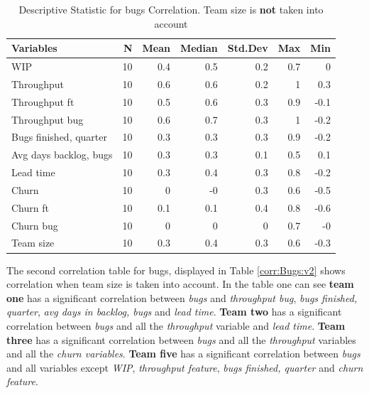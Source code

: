 \documentclass[UKenglish]{ifimaster}  %
\begin{document}
\begin{table} [h]
 \caption{Descriptive Statistic for bugs Correlation.  Team size is \textbf{not} taken into account}
 \centering
 \begin{tabular}{ | l | r | r | r | r | r | r | }
 \hline
\textbf{Variables}& \bf{N} & \bf{Mean} & \bf{Median} & \bf{Std.Dev} & \bf{Max} & \bf{Min} \\ \hline
WIP  & 10 & 0.4 & 0.5 & 0.2 & 0.7 & 0\\ \hline
Throughput  & 10 & 0.6 & 0.6 & 0.2 & 1 & 0.3\\ \hline
Throughput ft  & 10 & 0.5 & 0.6 & 0.3 & 0.9 & -0.1\\ \hline
Throughput bug  & 10 & 0.6 & 0.7 & 0.3 & 1 & -0.2\\ \hline
Bugs finished, quarter  & 10 & 0.3 & 0.3 & 0.3 & 0.9 & -0.2\\ \hline
Avg days backlog, bugs  & 10 & 0.3 & 0.3 & 0.1 & 0.5 & 0.1\\ \hline
Lead time & 10 & 0.3 & 0.4 & 0.3 & 0.8 & -0.2\\ \hline
Churn  & 10 & 0 & -0 & 0.3 & 0.6 & -0.5\\ \hline
Churn ft  & 10 & 0.1 & 0.1 & 0.4 & 0.8 & -0.6\\ \hline
Churn bug  & 10 & 0 & 0 & 0 & 0.7 & -0\\ \hline
Team size  & 10 & 0.3 & 0.4 & 0.3 & 0.6 & -0.3\\ \hline
\end{tabular}
 \label{DS:corr:Bugs}
 \end{table}
 \newpage
The second correlation table for bugs, displayed in Table \ref{corr:Bugs:v2} shows correlation when team size is taken into account. In the table one can see \textbf{team one} has a significant correlation between \textit{bugs} and \textit{throughput bug}, \textit{bugs finished, quarter}, \textit{avg days in backlog, bugs} and \textit{lead time}. \textbf{Team two} has a significant correlation between \textit{bugs} and all the \textit{throughput} variable and \textit{lead time}. \textbf{Team three} has a significant correlation between \textit{bugs} and all the \textit{throughput} variables and all the \textit{churn variables}. \textbf{Team five} has a significant correlation between \textit{bugs} and all variables except \textit{WIP}, \textit{throughput feature}, \textit{bugs finished, quarter} and \textit{churn feature}.
\end{document}
